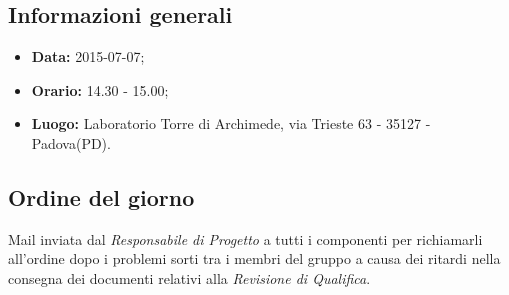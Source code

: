 \subsection{Informazioni generali}
\begin{itemize}
	\item \textbf{Data:} 2015-07-07;
	\item \textbf{Orario:} 14.30 - 15.00;
	\item \textbf{Luogo:} Laboratorio Torre di Archimede, via Trieste 63 - 35127 - Padova(PD).
\end{itemize}

\subsection{Ordine del giorno}
Mail inviata dal \textit{Responsabile di Progetto} a tutti i componenti per richiamarli all'ordine dopo i problemi sorti tra i membri del gruppo a causa dei ritardi nella consegna dei documenti relativi alla \textit{Revisione di Qualifica}.

